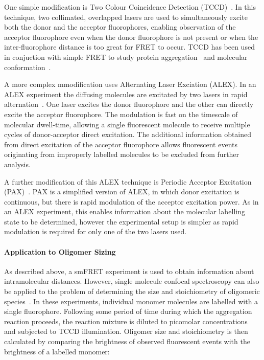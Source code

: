 One simple modification is Two Colour Coincidence Detection (TCCD)~\cite{orte06, orte10}. In this technique, two collimated, overlapped lasers are used to simultaneously excite both the donor and the acceptor fluorophores, enabling observation of the acceptor fluorophore even when the donor fluorophore is not present or when the inter-fluorophore distance is too great for FRET to occur. TCCD has been used in conjuction with simple FRET to study protein aggregation~\cite{cremades2012} and molecular conformation~\cite{Ye2012}.  

A more complex mmodification uses Alternating Laser Exciation (ALEX). In an ALEX experiment the diffusing molecules are excitated by two lasers in rapid alternation~\cite{kapanidis05}. One laser excites the donor fluorophore and the other can directly excite the acceptor fluorophore. The modulation is fast on the timescale of molecular dwell-time, allowing a single fluorescent molecule to receive multiple cycles of donor-acceptor direct excitation. The additional information obtained from direct excitation of the acceptor fluorophore allows fluorescent events originating from improperly labelled molecules to be excluded from further analysis. 

A further modification of this ALEX technique is Periodic Acceptor Excitation (PAX)~\cite{doose07}. PAX is a simplified version of ALEX, in which donor excitation is continuous, but there is rapid modulation of the acceptor excitation power. As in an ALEX experiment, this enables information about the molecular labelling state to be determined, however the experimental setup is simpler as rapid modulation is required for only one of the two lasers used.

\paragraph{Application to Oligomer Sizing}
As described above, a smFRET experiment is used to obtain information about intramolecular distances. However, single molecule confocal spectroscopy can also be applied to the problem of determining the size and stoichiometry of oligomeric species~\cite{orte10, cremades2012}. In these experiments, individual monomer molecules are labelled with a single fluorophore. Following some period of time during which the aggregation reaction proceeds, the reaction mixture is diluted to picomolar concentrations and subjected to TCCD illumination.  Oligomer size and stoichiometry is then calculated by comparing the brightness of observed fluorescent events with the brightness of a labelled monomer:

